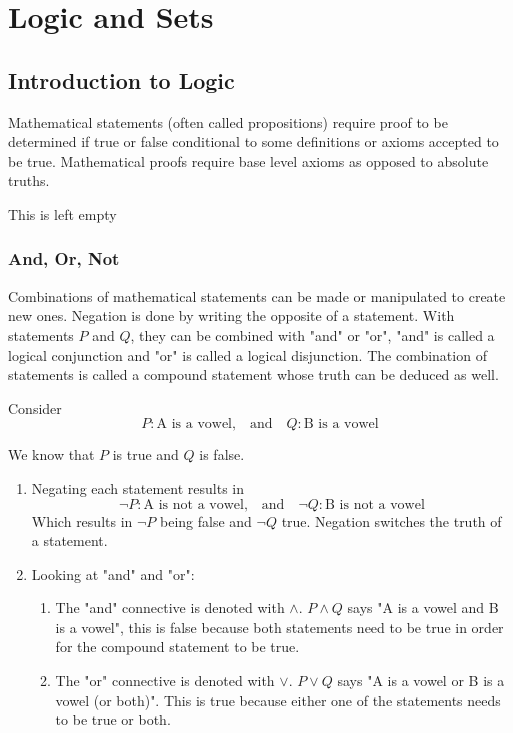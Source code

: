 \chapter{Logic and Sets}

\section{Introduction to Logic}

Mathematical statements (often called propositions) require proof to be determined if true or false conditional to some definitions or axioms accepted to be true.
Mathematical proofs require base level axioms as opposed to absolute truths.

\begin{remark}
    This is left empty
\end{remark}

\subsection{And, Or, Not}

Combinations of mathematical statements can be made or manipulated to create new ones.
Negation is done by writing the opposite of a statement.
With statements $P$ and $Q$, they can be combined with "and" or "or", "and" is called a logical conjunction and "or" is called a logical disjunction.
The combination of statements is called a compound statement whose truth can be deduced as well.

\begin{example}
    Consider
    $$
    P: \text{A is a vowel,} \quad \text{and} \quad Q: \text{B is a vowel}
    $$

    We know that $P$ is true and $Q$ is false.

    \begin{enumerate}
        \item Negating each statement results in
            $$
            \neg P: \text{A is not a vowel,} \quad \text{and} \quad \neg Q: \text{B is not a vowel}
            $$
            Which results in $\neg P$ being false and $\neg Q$ true. Negation switches the truth of a statement.
        \item Looking at "and" and "or":
            \begin{enumerate}[label=(\alph*)]
                \item The "and" connective is denoted with $\land$. $P \land Q$ says "A is a vowel and B is a vowel", this is false because both statements need to be true in order for the compound statement to be true.
                \item The "or" connective is denoted with $\lor$. $P \lor Q$ says "A is a vowel or B is a vowel (or both)". This is true because either one of the statements needs to be true or both.
            \end{enumerate}
    \end{enumerate}
\end{example}

